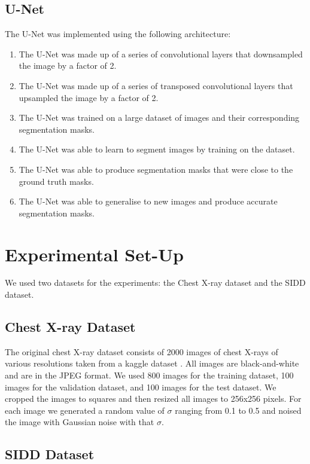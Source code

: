 \documentclass[12pt]{article}
\begin{document}
\subsection{U-Net}

The U-Net was implemented using the following architecture:

\begin{enumerate}
    \item The U-Net was made up of a series of convolutional layers that downsampled the image by a factor of 2.
    \item The U-Net was made up of a series of transposed convolutional layers that upsampled the image by a factor of 2.
    \item The U-Net was trained on a large dataset of images and their corresponding segmentation masks.
    \item The U-Net was able to learn to segment images by training on the dataset.
    \item The U-Net was able to produce segmentation masks that were close to the ground truth masks.
    \item The U-Net was able to generalise to new images and produce accurate segmentation masks.
\end{enumerate}

\section{Experimental Set-Up}

We used two datasets for the experiments: the Chest X-ray dataset and the SIDD dataset.

\subsection{Chest X-ray Dataset}

The original chest X-ray dataset consists of 2000 images of chest X-rays of various resolutions taken from a kaggle dataset \cite{kaggle}.
All images are black-and-white and are in the JPEG format.
We used 800 images for the training dataset, 100 images for the validation dataset, and 100 images for the test dataset.
We cropped the images to squares and then resized all images to 256x256 pixels.
For each image we generated a random value of $\sigma$ ranging from 0.1 to 0.5 and noised the image with Gaussian noise with that $\sigma$.

\subsection{SIDD Dataset}
\end{document}
